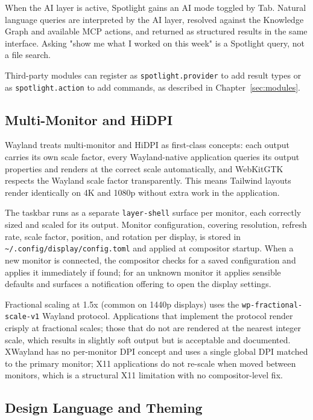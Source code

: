 When the AI layer is active, Spotlight gains an AI mode toggled by Tab.
Natural language queries are interpreted by the AI layer, resolved against the
Knowledge Graph and available MCP actions, and returned as structured results
in the same interface. Asking "show me what I worked on this week" is a
Spotlight query, not a file search.

Third-party modules can register as \texttt{spotlight.provider} to add result
types or as \texttt{spotlight.action} to add commands, as described in
Chapter~\ref{sec:modules}.

\subsection{Multi-Monitor and HiDPI}
\label{sec:multimonitor}

Wayland treats multi-monitor and HiDPI as first-class concepts: each output
carries its own scale factor, every Wayland-native application queries its
output properties and renders at the correct scale automatically, and
WebKitGTK respects the Wayland scale factor transparently. This means Tailwind
layouts render identically on 4K and 1080p without extra work in the
application.

The taskbar runs as a separate \texttt{layer-shell} surface per monitor, each
correctly sized and scaled for its output. Monitor configuration, covering
resolution, refresh rate, scale factor, position, and rotation per display, is
stored in \texttt{\textasciitilde/.config/display/config.toml} and applied at
compositor startup. When a new monitor is connected, the compositor checks for
a saved configuration and applies it immediately if found; for an unknown
monitor it applies sensible defaults and surfaces a notification offering to
open the display settings.

Fractional scaling at 1.5x (common on 1440p displays) uses the
\texttt{wp-fractional-scale-v1} Wayland protocol. Applications that implement
the protocol render crisply at fractional scales; those that do not are
rendered at the nearest integer scale, which results in slightly soft output
but is acceptable and documented. XWayland has no per-monitor DPI concept and
uses a single global DPI matched to the primary monitor; X11 applications do
not re-scale when moved between monitors, which is a structural X11 limitation
with no compositor-level fix.

\subsection{Design Language and Theming}
\label{sec:theming}

